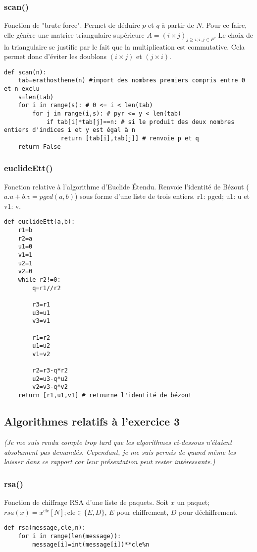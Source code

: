 \documentclass[10pt,a4paper,french]{article}
\newcounter{exercice}[section]
\begin{document}
\subsubsection{scan()}
Fonction de "brute force". Permet de déduire $p$ et $q$ à partir de $N$. Pour ce faire, elle génère une matrice triangulaire supérieure $A=(i\times j)_{j\geqslant i;i,j\in P}$. Le choix de la triangulaire se justifie par le fait que la multiplication est commutative. Cela permet donc d'éviter les doublons $(i \times j)$ et $(j\times i)$.
\begin{lstlisting}
def scan(n):
    tab=erathosthene(n) #import des nombres premiers compris entre 0 et n exclu
    s=len(tab)
    for i in range(s): # 0 <= i < len(tab)
        for j in range(i,s): # pyr <= y < len(tab)
            if tab[i]*tab[j]==n: # si le produit des deux nombres entiers d'indices i et y est égal à n
                return [tab[i],tab[j]] # renvoie p et q
    return False
\end{lstlisting}
\subsubsection{euclideEtt()}
Fonction relative à l'algorithme d'Euclide Étendu.  Renvoie l'identité de Bézout ($a.u+b.v=pgcd(a,b)$) sous forme d'une liste de trois entiers. r1: pgcd; u1: u et v1: v.
\begin{lstlisting}
def euclideEtt(a,b):
    r1=b
    r2=a
    u1=0
    v1=1
    u2=1
    v2=0
    while r2!=0:
        q=r1//r2
        
        r3=r1
        u3=u1
        v3=v1

        r1=r2
        u1=u2
        v1=v2

        r2=r3-q*r2
        u2=u3-q*u2
        v2=v3-q*v2
    return [r1,u1,v1] # retourne l'identité de bézout
\end{lstlisting}
\subsection{Algorithmes relatifs à l'exercice 3}
\textit{(Je me suis rendu compte trop tard que les algorithmes ci-dessous n'étaient absolument pas demandés. Cependant, je me suis permis de quand même les laisser dans ce rapport car leur présentation peut rester intéressante.)}
\subsubsection{rsa()}
Fonction de chiffrage RSA d'une liste de paquets. Soit $x$ un paquet; $rsa(x)=x^{\mbox{cle}}[N]; \mbox{cle} \in \{E,D\}$, $E$ pour chiffrement, $D$ pour déchiffrement.
\begin{lstlisting}
def rsa(message,cle,n):
    for i in range(len(message)):
        message[i]=int(message[i])**cle%n
\end{lstlisting}
\end{document}
